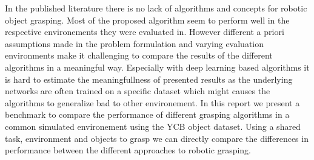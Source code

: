 In the published literature there is no lack of algorithms and concepts for robotic object grasping.
Most of the proposed algorithm seem to perform well in the respective environements they were evaluated in.%
However different a priori assumptions made in the problem formulation and varying evaluation environments make it challenging to compare the results of
the different algorithms in a meaningful way.
Especially with deep learning based algorithms it is hard to estimate the meaningfullness of presented results as the underlying networks are often trained on a specific dataset
which might causes the algorithms to generalize bad to other environement. %
In this report we present a benchmark to compare the performance of different grasping algorithms in a common simulated environement using the YCB object dataset.
Using a shared task, environment and objects to grasp we can directly compare the differences in performance between the different approaches to robotic grasping.
